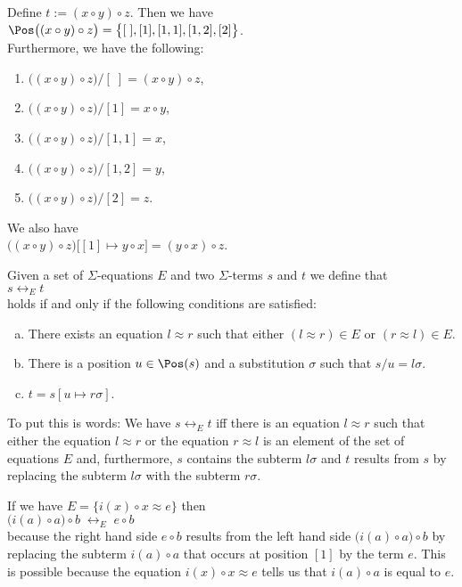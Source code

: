 \example
Define $t := (x \circ y) \circ z$.  Then we have
\\[0.2cm]
\hspace*{1.3cm}
$\Pos\bigl((x \circ y) \circ z\bigr) = \bigl\{ [\;], [1], [1,1], [1,2], [2]\bigr\}$.
\\[0.2cm]
Furthermore, we have the following:
\begin{enumerate}

\item $\bigl((x \circ y) \circ z\bigr)/[\;] = (x \circ y) \circ z$,
\item $\bigl((x \circ y) \circ z\bigr)/[1] = x \circ y$, 
\item $\bigl((x \circ y) \circ z\bigr)/[1,1] = x$,
\item $\bigl((x \circ y) \circ z\bigr)/[1,2] = y$,
\item $\bigl((x \circ y) \circ z\bigr)/[2]   = z$.
\end{enumerate}
We also have
\\[0.2cm]
\hspace*{1.3cm}
$\bigl((x \circ y) \circ z\bigr)\bigl[[1] \mapsto y \circ x\bigr] = (y \circ x) \circ z$. \eox

\begin{Definition}[$\leftrightarrow_E$]
  Given a set of $\Sigma$-equations $E$ and two $\Sigma$-terms $s$ and $t$ we define that
  \\[0.2cm]
  \hspace*{1.3cm}
  $s \leftrightarrow_E t$
  \\[0.2cm]
  holds if and only if the following conditions are satisfied:
  \begin{enumerate}[(a)]
  \item There exists an equation $l \approx r$  such that either $(l \approx r) \in E$ or $(r \approx l) \in  E$.
  \item There is a position $u \in \Pos(s)$ and a substitution $\sigma$ such that $s/u = l\sigma$.
  \item $t = s[u \mapsto r\sigma]$. \eox
  \end{enumerate}
\end{Definition}
To put this is words: We have $s \leftrightarrow_E t$ iff there is an equation $l \approx r$ such that
either the equation $l \approx r$ or the equation $r \approx l$ is an element of the set of equations $E$ and,
furthermore, $s$ contains the subterm $l\sigma$ and $t$ results from $s$ by replacing the subterm $l\sigma$
with the subterm $r\sigma$. 

\example
If we have $E = \bigl\{ i(x) \circ x \approx e \bigr\}$ then
\\[0.2cm]
\hspace*{1.3cm}
$\bigl(i(a) \circ a\bigr) \circ b \;\leftrightarrow_E\; e \circ b$
\\[0.2cm]
because the right hand side $e \circ b$ results from the left hand side $\bigl(i(a) \circ a\bigr) \circ b$ by
replacing the subterm $i(a) \circ a$ that occurs at position $[1]$ by the term $e$.
This is possible because the equation $i(x) \circ x \approx e$ tells us that $i(a) \circ a$ is equal to $e$.
\eod

